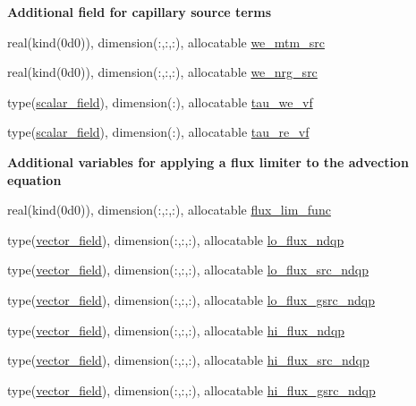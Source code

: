 \begin{Indent}\textbf{ Additional field for capillary source terms}\par
\begin{DoxyCompactItemize}
\item 
real(kind(0d0)), dimension(\+:,\+:,\+:), allocatable \hyperlink{namespacem__rhs_ace0c30f610f7a6b9e87eadd79e7197c0}{we\+\_\+mtm\+\_\+src}
\item 
real(kind(0d0)), dimension(\+:,\+:,\+:), allocatable \hyperlink{namespacem__rhs_adf3ae8008dd304f908c21bc0f0fcb2ac}{we\+\_\+nrg\+\_\+src}
\item 
type(\hyperlink{structm__derived__types_1_1scalar__field}{scalar\+\_\+field}), dimension(\+:), allocatable \hyperlink{namespacem__rhs_acc8e8d46f11ebb8f5c7389de8be28b60}{tau\+\_\+we\+\_\+vf}
\item 
type(\hyperlink{structm__derived__types_1_1scalar__field}{scalar\+\_\+field}), dimension(\+:), allocatable \hyperlink{namespacem__rhs_a7e3b4d8f32649ff607c52440009f903f}{tau\+\_\+re\+\_\+vf}
\end{DoxyCompactItemize}
\end{Indent}
\begin{Indent}\textbf{ Additional variables for applying a flux limiter to the advection equation}\par
\begin{DoxyCompactItemize}
\item 
real(kind(0d0)), dimension(\+:,\+:,\+:), allocatable \hyperlink{namespacem__rhs_a93dc4910f18014dacfb740debe18356d}{flux\+\_\+lim\+\_\+func}
\item 
type(\hyperlink{structm__derived__types_1_1vector__field}{vector\+\_\+field}), dimension(\+:,\+:,\+:), allocatable \hyperlink{namespacem__rhs_a3b8952eebc8ad3082a6dae29c2ddd480}{lo\+\_\+flux\+\_\+ndqp}
\item 
type(\hyperlink{structm__derived__types_1_1vector__field}{vector\+\_\+field}), dimension(\+:,\+:,\+:), allocatable \hyperlink{namespacem__rhs_abb201391897c33f0eb782f74f88d4ec0}{lo\+\_\+flux\+\_\+src\+\_\+ndqp}
\item 
type(\hyperlink{structm__derived__types_1_1vector__field}{vector\+\_\+field}), dimension(\+:,\+:,\+:), allocatable \hyperlink{namespacem__rhs_af07ecd26e050830ebeedaae6da3eb72a}{lo\+\_\+flux\+\_\+gsrc\+\_\+ndqp}
\item 
type(\hyperlink{structm__derived__types_1_1vector__field}{vector\+\_\+field}), dimension(\+:,\+:,\+:), allocatable \hyperlink{namespacem__rhs_af2fd928afcca77f0351ad57592dc53f4}{hi\+\_\+flux\+\_\+ndqp}
\item 
type(\hyperlink{structm__derived__types_1_1vector__field}{vector\+\_\+field}), dimension(\+:,\+:,\+:), allocatable \hyperlink{namespacem__rhs_a41372eab4f40baf2501e543f406a1cab}{hi\+\_\+flux\+\_\+src\+\_\+ndqp}
\item 
type(\hyperlink{structm__derived__types_1_1vector__field}{vector\+\_\+field}), dimension(\+:,\+:,\+:), allocatable \hyperlink{namespacem__rhs_a95522bf6827d87664b25022fe145eddf}{hi\+\_\+flux\+\_\+gsrc\+\_\+ndqp}
\end{DoxyCompactItemize}
\end{Indent}
